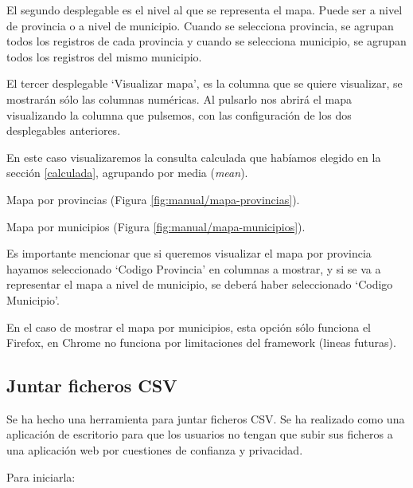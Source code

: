 El segundo desplegable es el nivel al que se representa el mapa. Puede ser a nivel de provincia o a nivel de municipio. Cuando se selecciona provincia, se agrupan todos los registros de cada provincia y cuando se selecciona municipio, se agrupan todos los registros del mismo municipio.

El tercer desplegable `Visualizar mapa', es la columna que se quiere visualizar, se mostrarán sólo las columnas numéricas. Al pulsarlo nos abrirá el mapa visualizando la columna que pulsemos, con las configuración de los dos desplegables anteriores.


En este caso visualizaremos la consulta calculada que habíamos elegido en la sección \ref{calculada}, agrupando por media (\textit{mean}).

Mapa por provincias (Figura \ref{fig:manual/mapa-provincias}).


Mapa por municipios (Figura \ref{fig:manual/mapa-municipios}).


Es importante mencionar que si queremos visualizar el mapa por provincia hayamos seleccionado `Codigo Provincia' en columnas a mostrar, y si se va a representar el mapa a nivel de municipio, se deberá haber seleccionado `Codigo Municipio'. 


En el caso de mostrar el mapa por municipios, esta opción sólo funciona el Firefox, en Chrome no funciona por limitaciones del framework (lineas futuras).

\newpage

\subsection{Juntar ficheros CSV}

Se ha hecho una herramienta para juntar ficheros CSV. Se ha realizado como una aplicación de escritorio para que los usuarios no tengan que subir sus ficheros a una aplicación web por cuestiones de confianza y privacidad.

Para iniciarla:

